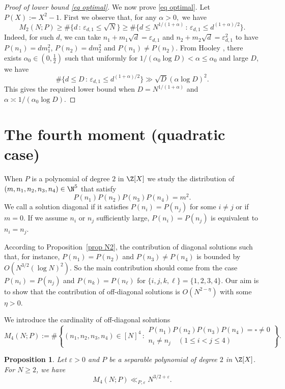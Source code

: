 \documentclass[reqno, 12pt]{amsart}
\theoremstyle{plain}
\newtheorem{proposition}[theorem]{Proposition}
\theoremstyle{definition}
\theoremstyle{remark}
\renewcommand{\le}{\leqslant}
\renewcommand{\leq}{\leqslant}
\renewcommand{\geq}{\geqslant}
\begin{document}
\begin{proof}[Proof of lower bound \eqref{eq optimal}]
We now prove \eqref{eq optimal}. Let $P(X):=X^2-1$. First we observe that, for any $\alpha>0,$  we have
$$M_2(N;P)\geq \#\{ d\,:\, \varepsilon_{d,1}\leq \sqrt{N}\}
\geq \#\{ d\leq N^{1/(1+\alpha)}\,:\, \varepsilon_{d,1}\leq d^{(1+\alpha)/2}\}.$$ Indeed, for such $d$, we can take $n_1+m_1\sqrt{d}= \varepsilon_{d,1}$ and $n_2+m_2\sqrt{d}= \varepsilon_{d,1}^2$ to have $P(n_1)=dm_1^2$, $P(n_2)=dm_2^2$ and  $P(n_1)\neq P(n_2).$ From Hooley \cite{H84}, there exists $\alpha_0\in (0,\tfrac12)$ such that uniformly for $1/(\alpha_0\log D)<\alpha\le \alpha_0$ and large $D$, we have 
$$\#\{ d\leq D\,:\, \varepsilon_{d,1}\leq d^{(1+\alpha)/2}\}\gg \sqrt{D}(\alpha \log D)^2.$$ This gives the required lower bound when $D=N^{1/(1+\alpha)}$ and $\alpha\asymp 1/(\alpha_0\log D).$\end{proof}

\section{The fourth moment (quadratic case)}

When $P$ is a polynomial of degree $2$ in $\Z[X]$ we study the distribution of  $(m,n_1,n_2,n_3,n_4)\in \N^5$ that satisfy 
\begin{equation}
    \label{eq 2 be a square}
P(n_1)P(n_2)P(n_3)P(n_4)=m^2.\end{equation} We call a solution  diagonal if it satisfies $P(n_i)=P(n_j)$ for some $i\neq j$ or if $m=0.$ If we assume $n_i$ or $n_j$ sufficiently large, $P(n_i)=P(n_j)$ is equivalent to $n_i=n_j$.

According to Proposition~\ref{prop N2}, the contribution of diagonal solutions such that, for instance, $P(n_1)=P(n_2)$ and $P(n_3)\neq P(n_4)$ is bounded by $O(N^{3/2}(\log N)^2).$ So the main contribution should come from the case $P(n_i)=P(n_j)$ and $P(n_k)=P(n_\ell)$ for $\{ i,j,k,\ell\}=\{ 1,2,3,4\}.$
Our aim is to show that the contribution of off-diagonal solutions is $O(N^{2-\eta})$ with some~$\eta>0$.

We introduce the cardinality of off-diagonal solutions
$$M_4(N;P):=\#\left\{ (n_1,n_2,n_3,n_4)\in [N]^4\,: \begin{array}{l} %
P(n_1)P(n_2)P(n_3)P(n_4)=\square \neq 0\\  n_i \neq  n_j\quad (1\leq i<j\leq 4) \end{array}\right\}.$$ 
\begin{proposition}
    \label{prop N4} Let $\varepsilon>0 $ and $P$ be a separable polynomial of degree $2$ in $\Z[X]$.  For $N\geq 2$, we have
    $$M_4(N;P)\ll_{P,\varepsilon} N^{3/2+\varepsilon}.$$
\end{proposition}
\end{document}
